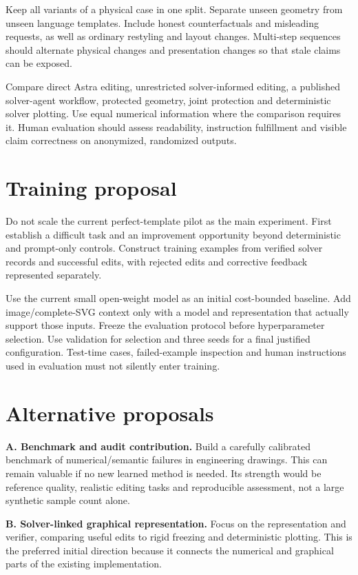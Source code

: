 \documentclass[
  11pt,
  a4paper,
]{article}
\begin{document}
Keep all variants of a physical case in one split. Separate unseen
geometry from unseen language templates. Include honest counterfactuals
and misleading requests, as well as ordinary restyling and layout
changes. Multi-step sequences should alternate physical changes and
presentation changes so that stale claims can be exposed.

Compare direct Astra editing, unrestricted solver-informed editing, a
published solver-agent workflow, protected geometry, joint protection
and deterministic solver plotting. Use equal numerical information where
the comparison requires it. Human evaluation should assess readability,
instruction fulfillment and visible claim correctness on anonymized,
randomized outputs.

\section{Training proposal}\label{training-proposal}

Do not scale the current perfect-template pilot as the main experiment.
First establish a difficult task and an improvement opportunity beyond
deterministic and prompt-only controls. Construct training examples from
verified solver records and successful edits, with rejected edits and
corrective feedback represented separately.

Use the current small open-weight model as an initial cost-bounded
baseline. Add image/complete-SVG context only with a model and
representation that actually support those inputs. Freeze the evaluation
protocol before hyperparameter selection. Use validation for selection
and three seeds for a final justified configuration. Test-time cases,
failed-example inspection and human instructions used in evaluation must
not silently enter training.

\section{Alternative proposals}\label{alternative-proposals}

\textbf{A. Benchmark and audit contribution.} Build a carefully
calibrated benchmark of numerical/semantic failures in engineering
drawings. This can remain valuable if no new learned method is needed.
Its strength would be reference quality, realistic editing tasks and
reproducible assessment, not a large synthetic sample count alone.

\textbf{B. Solver-linked graphical representation.} Focus on the
representation and verifier, comparing useful edits to rigid freezing
and deterministic plotting. This is the preferred initial direction
because it connects the numerical and graphical parts of the existing
implementation.
\end{document}
